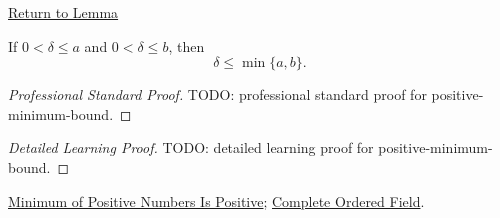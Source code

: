 \newpage
{}
\label{prf:positive-minimum-bound}

\begin{remark*}[Return]
\hyperref[lem:positive-minimum-bound]{Return to Lemma}
\end{remark*}

\begin{lemma*}
If $0<\delta\le a$ and $0<\delta\le b$, then
\[
\delta\le \min\{a,b\}.
\]
\end{lemma*}

\begin{proof}[Professional Standard Proof]
\LRAProofBodyStart
TODO: professional standard proof for positive-minimum-bound.
\end{proof}

\begin{proof}[Detailed Learning Proof]
\LRAProofBodyStart
TODO: detailed learning proof for positive-minimum-bound.
\end{proof}

\begin{remark*}
\end{remark*}

\begin{dependencies}
\hyperref[lem:minimum-of-positive-numbers-is-positive]{Minimum of Positive Numbers Is Positive};
\hyperref[def:real-ordered-field]{Complete Ordered Field}.
\end{dependencies}

\clearpage
